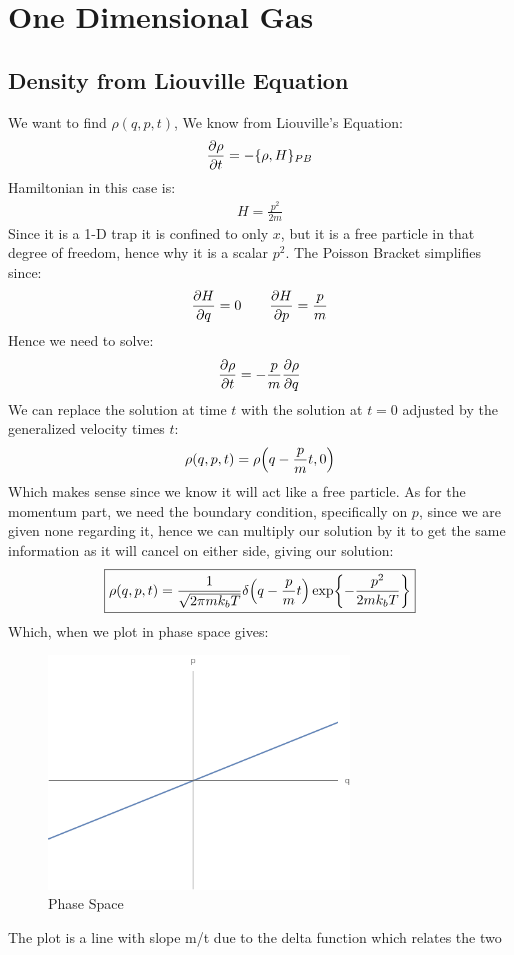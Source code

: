 \documentclass[12pt]{article}
\newcommand{\PB}[2]{\{#1,#2\}_{PB}}
\begin{document}
\section{One Dimensional Gas}
\subsection{Density from Liouville Equation}
We want to find $\rho(q,p,t)$, We know from Liouville's Equation:
\begin{align*}
  \pdv{\rho}{t}=-\PB{\rho}{H}
\end{align*}
Hamiltonian in this case is:
\begin{align*}
  H=\frac{p^2}{2m}
\end{align*}
Since it is a 1-D trap it is confined to only $x$, but it is a free particle in that degree of freedom, hence why it is a scalar $p^2$. The Poisson Bracket simplifies since:
\begin{align*}
  \pdv{H}{q}=0\qquad\pdv{H}{p}=\frac{p}{m}
\end{align*}
Hence we need to solve:
\begin{align*}
  \pdv{\rho}{t}=-\frac{p}{m}\pdv{\rho}{q}
\end{align*}
We can replace the solution at time $t$ with the solution at $t=0$ adjusted by the generalized velocity times $t$:
\begin{align*}
  \rho(q,p,t)=\rho\qty(q-\frac{p}{m}t,0)
\end{align*}
Which makes sense since we know it will act like a free particle. As for the momentum part, we need the boundary condition, specifically on $p$, since we are given none regarding it, hence we can multiply our solution by it to get the same information as it will cancel on either side, giving our solution:
\begin{align}
  \boxed{\rho(q,p,t)=\frac1{\sqrt{2\pi mk_bT}}
  \delta\qty(q-\frac{p}mt)\exp{-\frac{p^2}{2mk_bT}}}
\end{align}
Which, when we plot in phase space gives:
\begin{figure}[H]
  \centering
  \includegraphics[width=8.0cm]{phase4.png}
  \caption{Phase Space}
\end{figure}
The plot is a line with slope m/t due to the delta function which relates the two
\end{document}

